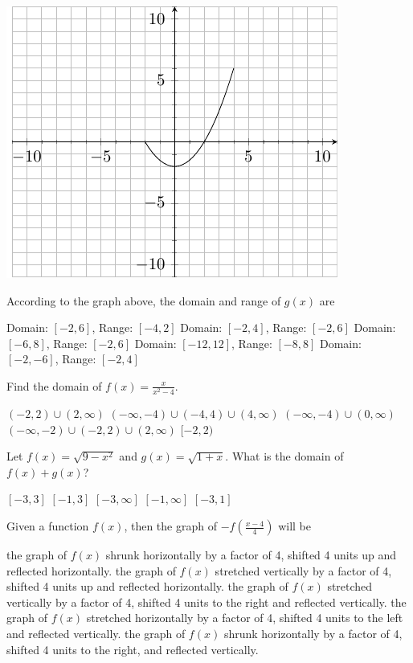\documentclass[11pt]{article}
\begin{document}
\begin{questions}
\begin{multiplechoice}{5}
\begin{minipage}{\linewidth}%
\centering
\makebox[\linewidth]{}
\includegraphics{exam1graph2.pdf}
\label{graph2exam1}%
\end{minipage}
According to the graph above, the domain and range of $g(x)$ are
\begin{answers}{2}
\ans Domain: $[-2,6]$, Range: $[-4,2]$
\ans Domain: $[-2,4]$, Range: $[-2,6]$
\ans Domain: $[-6,8]$, Range: $[-2,6]$
\ans Domain: $[-12,12]$, Range: $[-8,8]$
\ans Domain: $[-2,-6]$, Range: $[-2,4]$
\end{answers}

\question Find the domain of $f(x) = \frac{x}{x^2-4}$.
\begin{answers}{2}
\ans $(-2,2) \cup (2, \infty)$
\ans $(-\infty, -4) \cup (-4,4) \cup (4, \infty) $
\ans  $(-\infty, -4) \cup (0, \infty)$
\ans  $(-\infty, -2) \cup (-2,2) \cup (2, \infty)$
\ans $[-2,2)$
\end{answers}


\question Let $f(x) = \sqrt{9-x^2}$ and $g(x)=\sqrt{1+x}$.  What is the domain of $f(x)+g(x)$?
\begin{answers}{2}
\ans $[-3,3]$
\ans $[-1,3]$
\ans $[-3,\infty]$
\ans $[-1,\infty]$
\ans $[-3,1]$
\end{answers}

\nextpage

\question Given a function $f(x)$, then the graph of $-f\left(\frac{x-4}{4}\right)$ will be
\begin{answers}{2}
\ans the graph of $f(x)$ shrunk horizontally by a factor of 4, shifted 4 units up and reflected horizontally.
\ans the graph of $f(x)$ stretched vertically by a factor of 4, shifted 4 units up and reflected horizontally.
\ans the graph of $f(x)$ stretched vertically by a factor of 4, shifted 4 units to the right and reflected vertically.
\ans the graph of $f(x)$ stretched horizontally by a factor of 4, shifted 4 units to the left and reflected vertically. %
\ans the graph of $f(x)$ shrunk horizontally by a factor of 4, shifted 4 units to the right, and reflected vertically.
\end{answers}



\end{multiplechoice}
\end{questions}
\end{document}
